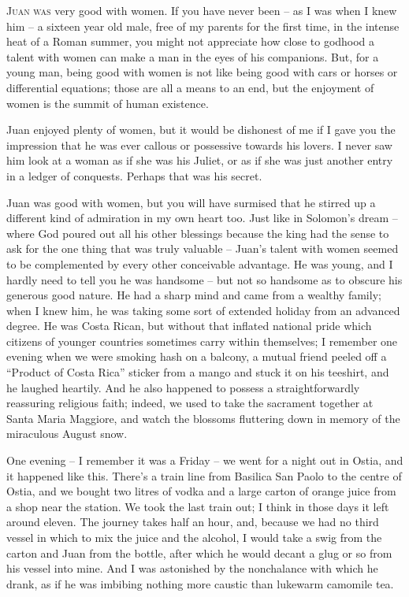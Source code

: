 \noindent \textsc{Juan was} very good with women. If you have never been -- as I was when I knew him -- a sixteen year old male, free of my parents for the first time, in the intense heat of a Roman summer, you might not appreciate how close to godhood a talent with women can make a man in the eyes of his companions. But, for a young man, being good with women is not like being good with cars or horses or differential equations; those are all a means to an end, but the enjoyment of women is the summit of human existence.

Juan enjoyed plenty of women, but it would be dishonest of me if I gave you the impression that he was ever callous or possessive towards his lovers. I never saw him look at a woman as if she was his Juliet, or as if she was just another entry in a ledger of conquests. Perhaps that was his secret.

Juan was good with women, but you will have surmised that he stirred up a different kind of admiration in my own heart too. Just like in Solomon's dream -- where God poured out all his other blessings because the king had the sense to ask for the one thing that was truly valuable -- Juan's talent with women seemed to be complemented by every other conceivable advantage. He was young, and I hardly need to tell you he was handsome -- but not so handsome as to obscure his generous good nature. He had a sharp mind and came from a wealthy family; when I knew him, he was taking some sort of extended holiday from an advanced degree. He was Costa Rican, but without that inflated national pride which citizens of younger countries sometimes carry within themselves; I remember one evening when we were smoking hash on a balcony, a mutual friend peeled off a ``Product of Costa Rica'' sticker from a mango and stuck it on his teeshirt, and he laughed heartily. And he also happened to possess a straightforwardly reassuring religious faith; indeed, we used to take the sacrament together at Santa Maria Maggiore, and watch the blossoms fluttering down in memory of the miraculous August snow.

\prosesep

One evening -- I remember it was a Friday -- we went for a night out in Ostia, and it happened like this. There's a train line from Basilica San Paolo to the centre of Ostia, and we bought two litres of vodka and a large carton of orange juice from a shop near the station. We took the last train out; I think in those days it left around eleven. The journey takes half an hour, and, because we had no third vessel in which to mix the juice and the alcohol, I would take a swig from the carton and Juan from the bottle, after which he would decant a glug or so from his vessel into mine. And I was astonished by the nonchalance with which he drank, as if he was imbibing nothing more caustic than lukewarm camomile tea.

